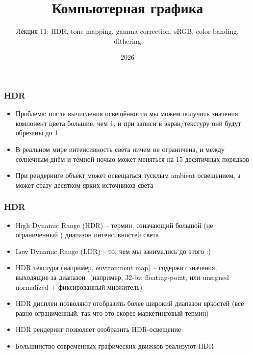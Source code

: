 \documentclass[10pt]{beamer}
\title{Компьютерная графика}
\subtitle{Лекция 11: HDR, tone mapping, gamma correction, sRGB, color banding, dithering}
\date{2026}
\begin{document}
\frame{\titlepage}

\begin{frame}[fragile]
\frametitle{HDR}
\begin{itemize}
\item Проблема: после вычисления освещённости мы можем получить значения компонент цвета большие, чем 1, и при записи в экран/текстуру они будут обрезаны до 1
\pause
\item В реальном мире интенсивность света ничем не ограничена, и между солнечным днём и тёмной ночью может меняться на 15 десятичных порядков
\pause
\item При рендеринге объект может освещаться тусклым ambient освещением, а может сразу десятком ярких источников света
\end{itemize}
\end{frame}

\begin{frame}[fragile]
\frametitle{HDR}
\begin{itemize}
\item High Dynamic Range (HDR) -- термин, означающий большой (не ограниченный \begin{math}[0, 1]\end{math}) диапазон интенсивностей света
\pause
\item Low Dynamic Range (LDR) -- то, чем мы занимались до этого :)
\pause
\item HDR текстура (например, environment map) -- содержит значения, выходящие за диапазон \begin{math}[0, 1]\end{math} (например, 32-bit floating-point, или unsigned normalized + фиксированный множитель)
\pause
\item HDR дисплеи позволяют отобразить более широкий диапазон яркостей (всё равно ограниченный, так что это скорее маркетинговый термин)
\pause
\item HDR рендеринг позволяет отобразить HDR-освещение
\pause
\item Большинство современных графических движков реализуют HDR
\end{itemize}
\end{frame}
\end{document}
